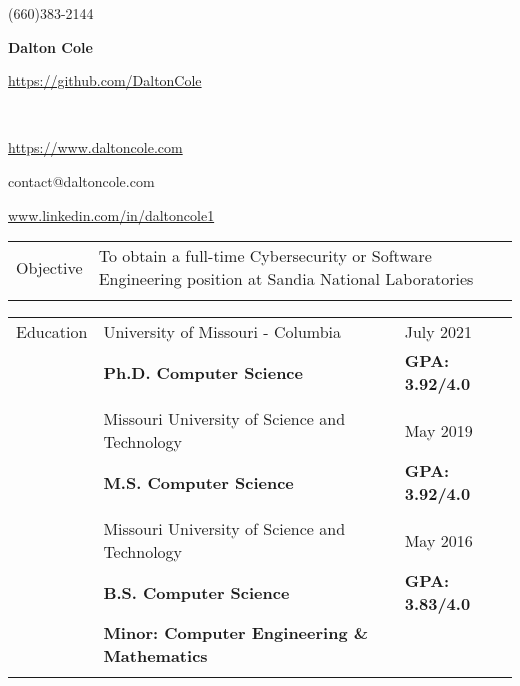 \documentclass[10.5pt, arial]{article}
\newcommand\textbox[1]{%
  \parbox{.333\textwidth}{#1}%
}
\begin{document}
\noindent   \textbox{(660)383-2144 \hfill}                                \textbox{\hfil \textbf{Dalton Cole}    \hfil} \textbox{\hfill \url{https://github.com/DaltonCole}} \\
\noindent   \textbox{\url{https://www.daltoncole.com} \hfill}     \textbox{\hfil contact@daltoncole.com  \hfil}               \textbox{\hfill \url{www.linkedin.com/in/daltoncole1}}
\noindent\makebox[\linewidth]{\rule{\textwidth}{.4pt}} 

\begin{tabular}{p{1.5cm} l}
        Objective  	& To obtain a full-time Cybersecurity or Software Engineering position at Sandia National Laboratories  \\ \\
\end{tabular}

\begin{tabular}{p{1.5cm} p{13.2cm} l}
Education  	& University of Missouri - Columbia				 					& July 2021 				\\
			& \textbf{Ph.D. Computer Science} 									& \textbf{GPA: 3.92/4.0}	\\
            \\
			& Missouri University of Science and Technology 					& May 2019 				    \\
			& \textbf{M.S. Computer Science}									& \textbf{GPA: 3.92/4.0}	\\
            \\
		  	& Missouri University of Science and Technology 					& May 2016 				    \\
			& \textbf{B.S. Computer Science} 									& \textbf{GPA: 3.83/4.0}    \\
			& \textbf{Minor: Computer Engineering \& Mathematics} 										    \\ \\
\end{tabular}
\end{document}
